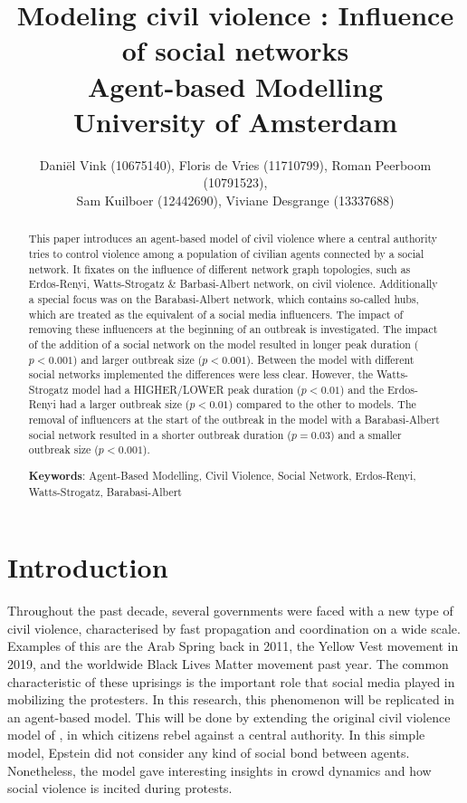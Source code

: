 \documentclass[10pt]{article}
\title{Modeling civil violence : Influence of social networks \large \\ Agent-based Modelling \\University of Amsterdam\\}
\author{Daniël Vink (10675140), Floris de Vries (11710799), Roman Peerboom (10791523),\\ Sam Kuilboer (12442690), Viviane Desgrange (13337688)}
\date{}
\begin{document}
    \maketitle

    \begin{abstract}
    {\normalsize  This paper introduces an agent-based model of civil violence where a central authority tries to control violence among a population of civilian agents connected by a social network. It fixates on the influence of different network graph topologies, such as Erdos-Renyi, Watts-Strogatz \& Barbasi-Albert network, on civil violence. Additionally a special focus was on the Barabasi-Albert network, which contains so-called hubs, which are treated as the equivalent of a social media influencers. The impact of removing these influencers at the beginning of an outbreak is investigated.
    The impact of the addition of a social network on the model resulted in longer peak duration ($p<0.001$) and larger outbreak size ($p<0.001$). Between the model with different social networks implemented the differences were less clear. However, the Watts-Strogatz model had a HIGHER/LOWER peak duration ($p<0.01$) and the Erdos-Renyi had a larger outbreak size ($p<0.01$) compared to the other to models. The removal of influencers at the start of the outbreak in the model with a Barabasi-Albert social network resulted in a shorter outbreak duration ($p = 0.03$) and a smaller outbreak size ($p < 0.001$).
    }

        \smallskip
        \noindent
        {\normalsize \textbf{Keywords}: Agent-Based Modelling, Civil Violence, Social Network, Erdos-Renyi, Watts-Strogatz, Barabasi-Albert}
    \end{abstract}

    \newpage

    \section*{Introduction}
    Throughout the past decade, several governments were faced with a new type of civil violence, characterised by fast propagation and coordination on a wide scale. Examples of this are the Arab Spring back in 2011, the Yellow Vest movement in 2019, and the worldwide Black Lives Matter movement past year. The common characteristic of these uprisings is the important role that social media played in mobilizing the protesters. In this research, this phenomenon will be replicated in an agent-based model.
    This will be done by extending the original civil violence model of \cite{epstein2002}, in which citizens rebel against a central authority. In this simple model, Epstein did not consider any kind of social bond between agents. Nonetheless, the model gave interesting insights in crowd dynamics and how social violence is incited during protests.
\end{document}
